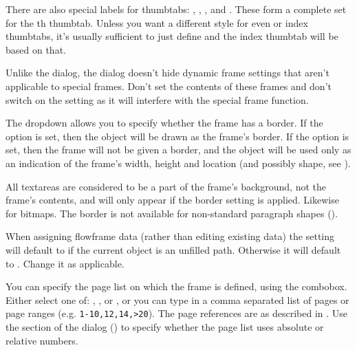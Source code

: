 There are also special labels for thumbtabs:
,
,
, and
.
These form a complete set for the th thumbtab. Unless you
want a different style for even or index thumbtabs, it's usually
sufficient to just define 
and the index thumbtab will be based on that.

\begin{important}
Unlike the  dialog, the  dialog
doesn't hide dynamic frame settings that aren't applicable to
special frames. Don't set the contents of these frames and don't
switch on the  setting as it will interfere
with the special frame function.
\end{important}


The  \gls*{dropdown} allows you
to specify whether the frame has a border. If the option
 is set, then the
\gls{object} will be drawn as the frame's border. If the option
 is set, then the frame will
not be given a border, and the object will be used only as an
indication of the frame's width, height and location (and
possibly shape, see ).

\begin{information}
All \glspl{textarea} are considered to be a part of the
frame's background, not the frame's contents, and will only appear if
the border  setting is
applied. Likewise for \glspl{bitmap}. The border is not available
for non-standard paragraph shapes ().
\end{information}

When assigning \gls{flowframe} data (rather than editing existing
data) the  setting will default to
 if the current object is an unfilled
\gls{path}.  Otherwise it will default to
. Change it as applicable.


You can specify the page list on which the frame is defined, using the
 \gls*{combobox}. Either select one of:
,
,
 or
, or you can type in a comma
separated list of pages or page ranges (e.g. \verb|1-10,12,14,>20|).
The page references are as described in
. Use the
 section of the
 dialog () to
specify whether the page list uses absolute or relative numbers.

